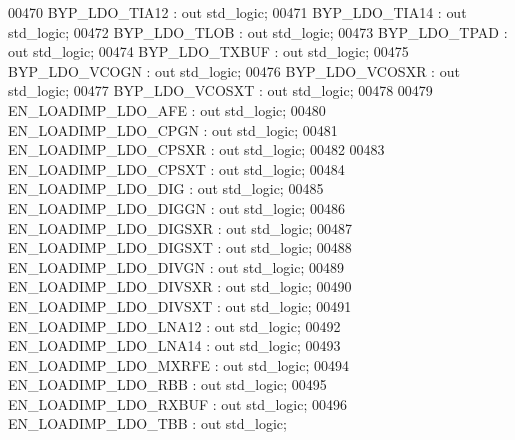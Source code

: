 \begin{DoxyCode}
00470         BYP\_LDO\_TIA12         : \textcolor{keywordflow}{out} \textcolor{comment}{std\_logic};
00471         BYP\_LDO\_TIA14         : \textcolor{keywordflow}{out} \textcolor{comment}{std\_logic};
00472         BYP\_LDO\_TLOB          : \textcolor{keywordflow}{out} \textcolor{comment}{std\_logic};
00473         BYP\_LDO\_TPAD          : \textcolor{keywordflow}{out} \textcolor{comment}{std\_logic};
00474         BYP\_LDO\_TXBUF         : \textcolor{keywordflow}{out} \textcolor{comment}{std\_logic};
00475         BYP\_LDO\_VCOGN         : \textcolor{keywordflow}{out} \textcolor{comment}{std\_logic};
00476         BYP\_LDO\_VCOSXR        : \textcolor{keywordflow}{out} \textcolor{comment}{std\_logic};
00477         BYP\_LDO\_VCOSXT        : \textcolor{keywordflow}{out} \textcolor{comment}{std\_logic};
00478                       
00479         EN\_LOADIMP\_LDO\_AFE    : \textcolor{keywordflow}{out} \textcolor{comment}{std\_logic};
00480         EN\_LOADIMP\_LDO\_CPGN   : \textcolor{keywordflow}{out} \textcolor{comment}{std\_logic};
00481         EN\_LOADIMP\_LDO\_CPSXR  : \textcolor{keywordflow}{out} \textcolor{comment}{std\_logic};
00482 
00483         EN\_LOADIMP\_LDO\_CPSXT    : \textcolor{keywordflow}{out} \textcolor{comment}{std\_logic};
00484         EN\_LOADIMP\_LDO\_DIG    : \textcolor{keywordflow}{out} \textcolor{comment}{std\_logic};
00485         EN\_LOADIMP\_LDO\_DIGGN  : \textcolor{keywordflow}{out} \textcolor{comment}{std\_logic};
00486         EN\_LOADIMP\_LDO\_DIGSXR : \textcolor{keywordflow}{out} \textcolor{comment}{std\_logic};
00487         EN\_LOADIMP\_LDO\_DIGSXT : \textcolor{keywordflow}{out} \textcolor{comment}{std\_logic};
00488         EN\_LOADIMP\_LDO\_DIVGN  : \textcolor{keywordflow}{out} \textcolor{comment}{std\_logic};
00489         EN\_LOADIMP\_LDO\_DIVSXR : \textcolor{keywordflow}{out} \textcolor{comment}{std\_logic};
00490         EN\_LOADIMP\_LDO\_DIVSXT : \textcolor{keywordflow}{out} \textcolor{comment}{std\_logic};
00491         EN\_LOADIMP\_LDO\_LNA12  : \textcolor{keywordflow}{out} \textcolor{comment}{std\_logic};
00492         EN\_LOADIMP\_LDO\_LNA14  : \textcolor{keywordflow}{out} \textcolor{comment}{std\_logic};
00493         EN\_LOADIMP\_LDO\_MXRFE  : \textcolor{keywordflow}{out} \textcolor{comment}{std\_logic};
00494         EN\_LOADIMP\_LDO\_RBB    : \textcolor{keywordflow}{out} \textcolor{comment}{std\_logic};
00495         EN\_LOADIMP\_LDO\_RXBUF  : \textcolor{keywordflow}{out} \textcolor{comment}{std\_logic};
00496         EN\_LOADIMP\_LDO\_TBB    : \textcolor{keywordflow}{out} \textcolor{comment}{std\_logic};

\end{DoxyCode}
